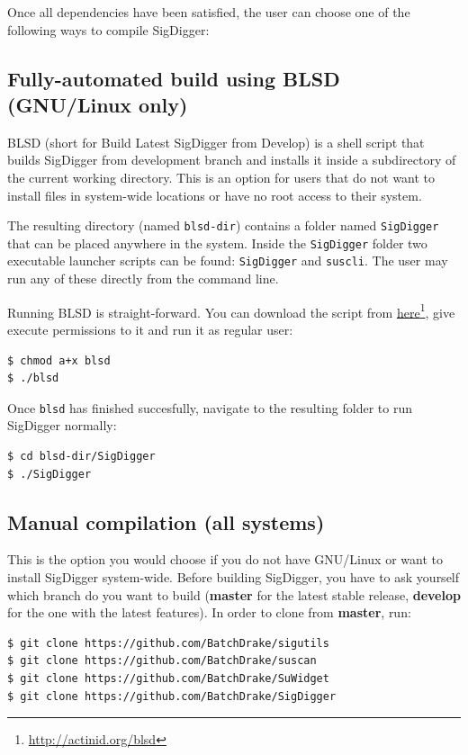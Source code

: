 \documentclass{ol-softwaremanual}
\newcommand{\doclink}[2]{\href{#1}{#2}\footnote{\url{#1}}}
\begin{document}
Once all dependencies have been satisfied, the user can choose one of the following ways to compile SigDigger:

\subsection{Fully-automated build using BLSD (GNU/Linux only)}
BLSD (short for Build Latest SigDigger from Develop) is a shell script that builds SigDigger from development branch and installs it inside a subdirectory of the current working directory.  This is an option for users that do not want to install files in system-wide locations or have no root access to their system. 

The resulting directory (named \texttt{blsd-dir}) contains a folder named \texttt{SigDigger} that can be placed anywhere in the system. Inside the \texttt{SigDigger} folder two executable launcher scripts can be found: \texttt{SigDigger} and \texttt{suscli}. The user may run any of these directly from the command line.

Running BLSD is straight-forward. You can download the script from \doclink{http://actinid.org/blsd}{here}, give execute permissions to it and run it as regular user:

\begin{lstlisting}
$ chmod a+x blsd
$ ./blsd
\end{lstlisting}

Once \texttt{blsd} has finished succesfully, navigate to the resulting folder to run SigDigger normally:

\begin{lstlisting}
$ cd blsd-dir/SigDigger
$ ./SigDigger
\end{lstlisting}

\subsection{Manual compilation (all systems)}
This is the option you would choose if you do not have GNU/Linux or want to install SigDigger system-wide. Before building SigDigger, you have to ask yourself which branch do you want to build (\textbf{master} for the latest stable release, \textbf{develop} for the one with the latest features). In order to clone from \textbf{master}, run:

\begin{lstlisting}
$ git clone https://github.com/BatchDrake/sigutils
$ git clone https://github.com/BatchDrake/suscan
$ git clone https://github.com/BatchDrake/SuWidget
$ git clone https://github.com/BatchDrake/SigDigger
\end{lstlisting}
\end{document}
